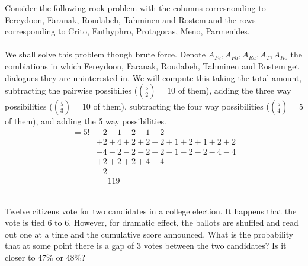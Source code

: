 \documentclass[12pt,letterpaper,boxed]{hmcpset}
\begin{document}
\begin{solution}
Consider the following rook problem with the columns corresnonding to Fereydoon, Faranak, Roudabeh, Tahminen and Rostem and the rows corresponding to Crito, Euthyphro, Protagoras, Meno, Parmenides.\\
\\
We shall solve this problem though brute force. Denote $A_{Fe}, A_{Fa},A_{Ra},A_T,A_{Ro}$ the combiations in which Fereydoon, Faranak, Roudabeh, Tahminen and Rostem get dialogues they are uninterested in.
We will compute this taking the total amount, subtracting the pairwise possibilies ($\binom{5}{2}=10$ of them), adding the three way possibilities ($\binom{5}{3}=10$ of them), subtracting the four way possibilities ($\binom{5}{4}=5$ of them), and adding the 5 way possibilities.
\begin{align*}
= 5!&-2-1-2-1-2\\
	&+2+4+2+2+2+1+2+1+2+2 \\
	&-4-2-2-2-2-1-2-2-4-4\\
	&+2+2+2+4+4\\
	&-2\\
	&=\boxed{119}
\end{align*}

\end{solution}

\begin{problem}[Shahriari 8.X.1][20]\\
 Twelve citizens vote for two candidates in a college election. It happens that the vote
is tied 6 to 6. However, for dramatic effect, the ballots are shuffled and read out one at a time
and the cumulative score announced. What is the probability that at some point there is a
gap of 3 votes between the two candidates? Is it closer to 47\% or 48\%?
\end{problem}
\end{document}
